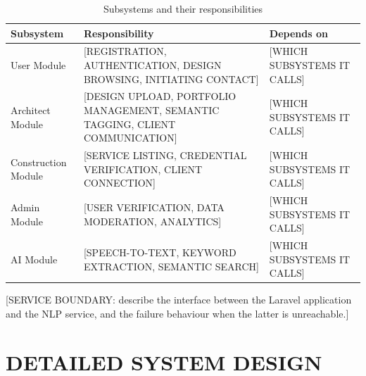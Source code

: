 \begin{table}[H]
  \centering
  \caption{Subsystems and their responsibilities}
  \label{tab:subsystems}
  \small
  \begin{tabularx}{\textwidth}{|l|X|X|}
    \hline
    \textbf{Subsystem} & \textbf{Responsibility} & \textbf{Depends on} \\
    \hline
    User Module & [REGISTRATION, AUTHENTICATION, DESIGN BROWSING,
      INITIATING CONTACT] & [WHICH SUBSYSTEMS IT CALLS] \\
    \hline
    Architect Module & [DESIGN UPLOAD, PORTFOLIO MANAGEMENT, SEMANTIC
      TAGGING, CLIENT COMMUNICATION] & [WHICH SUBSYSTEMS IT CALLS] \\
    \hline
    Construction Module & [SERVICE LISTING, CREDENTIAL VERIFICATION,
      CLIENT CONNECTION] & [WHICH SUBSYSTEMS IT CALLS] \\
    \hline
    Admin Module & [USER VERIFICATION, DATA MODERATION, ANALYTICS] &
      [WHICH SUBSYSTEMS IT CALLS] \\
    \hline
    AI Module & [SPEECH-TO-TEXT, KEYWORD EXTRACTION, SEMANTIC SEARCH] &
      [WHICH SUBSYSTEMS IT CALLS] \\
    \hline
  \end{tabularx}
\end{table}

[SERVICE BOUNDARY: describe the interface between the Laravel
application and the NLP service, and the failure behaviour when the
latter is unreachable.]

\section{DETAILED SYSTEM DESIGN}
\label{sec:detailed-design}

